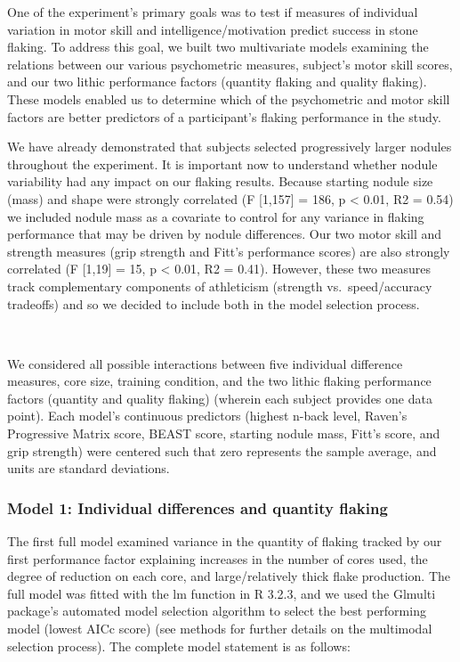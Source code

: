 \documentclass[smallextended]{svjour3}       %
\begin{document}
One of the experiment's primary goals was to test if measures of
individual variation in motor skill and intelligence/motivation predict
success in stone flaking. To address this goal, we built two
multivariate models examining the relations between our various
psychometric measures, subject's motor skill scores, and our two lithic
performance factors (quantity flaking and quality flaking). These models
enabled us to determine which of the psychometric and motor skill
factors are better predictors of a participant's flaking performance in
the study.

We have already demonstrated that subjects selected progressively larger
nodules throughout the experiment. It is important now to understand
whether nodule variability had any impact on our flaking results.
Because starting nodule size (mass) and shape were strongly correlated
(F {[}1,157{]} = 186, p \textless{} 0.01, R2 = 0.54) we included nodule
mass as a covariate to control for any variance in flaking performance
that may be driven by nodule differences. Our two motor skill and
strength measures (grip strength and Fitt's performance scores) are also
strongly correlated (F {[}1,19{]} = 15, p \textless{} 0.01, R2 = 0.41).
However, these two measures track complementary components of
athleticism (strength vs.~speed/accuracy tradeoffs) and so we decided to
include both in the model selection process.

~

We considered all possible interactions between five individual
difference measures, core size, training condition, and the two lithic
flaking performance factors (quantity and quality flaking) (wherein each
subject provides one data point). Each model's continuous predictors
(highest n-back level, Raven's Progressive Matrix score, BEAST score,
starting nodule mass, Fitt's score, and grip strength) were centered
such that zero represents the sample average, and units are standard
deviations.~

\hypertarget{model-1-individual-differences-and-quantity-flaking}{%
\subsubsection{\texorpdfstring{\textbf{Model 1: Individual differences
and quantity
flaking}}{Model 1: Individual differences and quantity flaking}}\label{model-1-individual-differences-and-quantity-flaking}}

The first full model examined variance in the quantity of flaking
tracked by our first performance factor explaining increases in the
number of cores used, the degree of reduction on each core, and
large/relatively thick flake production. The full model was fitted with
the lm function in R 3.2.3, and we used the Glmulti package's automated
model selection algorithm to select the best performing model (lowest
AICc score) (see methods for further details on the multimodal selection
process). The complete model statement is as follows:
\end{document}
